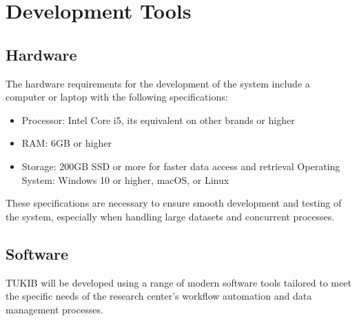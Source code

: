 \section{Development Tools}

\subsection{Hardware}

The hardware requirements for the development of the system include a computer or laptop with the following specifications:

\begin{itemize}
	\item Processor: Intel Core i5, its equivalent on other brands or higher
	\item RAM: 6GB or higher
	\item Storage: 200GB SSD or more for faster data access and retrieval
	Operating System: Windows 10 or higher, macOS, or Linux
\end{itemize}

These specifications are necessary to ensure smooth development and testing of the system, especially when handling large datasets and concurrent processes.

\subsection{Software}

TUKIB will be developed using a range of modern software tools tailored to meet the specific needs of the research center’s workflow automation and data management processes.

